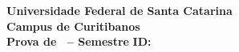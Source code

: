 \documentclass[10pt,a4paper]{article}
\makeatletter
\newcommand{\myCourse}{\@Course}
\newcommand{\mySemester}{\@Semester}
\newcommand{\myID}{\@ID}
\makeatother
\begin{document}
\thispagestyle{empty}
{\sf
\begin{center}
    \textbf{\LARGE Universidade Federal de Santa Catarina}\\[0.15cm]
    \textbf{\Large Campus de Curitibanos}\\[0.5cm]
    \textbf{\large Prova de \myCourse \ -- Semestre \mySemester} \hfill \textbf{ID: \myID}
\end{center}

\vspace{0.3cm}

\noindent{}
}

\vspace*{0.8cm}

\begin{enumerate}
\setlength{\itemsep}{1.5em} %
\end{enumerate}
\end{document}
